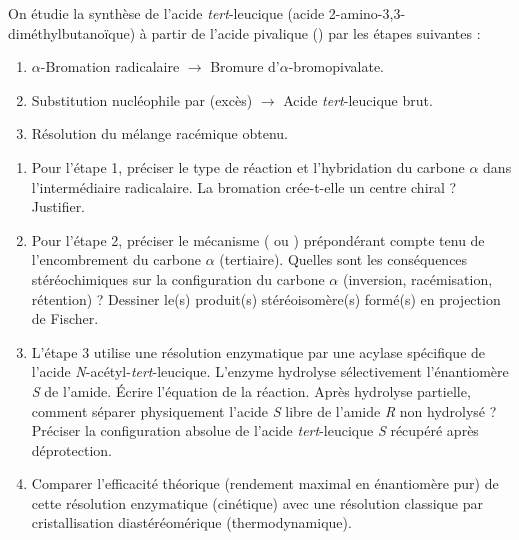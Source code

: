\documentclass[11pt]{article}
\begin{document}
\begin{exercice}
On étudie la synthèse de l'acide \textit{tert}-leucique (acide 2-amino-3,3-diméthylbutanoïque) à partir de l'acide pivalique () par les étapes suivantes :
\begin{enumerate}
    \item $\alpha$-Bromation radicalaire $\to$ Bromure d'$\alpha$-bromopivalate.
    \item Substitution nucléophile par  (excès) $\to$ Acide \textit{tert}-leucique brut.
    \item Résolution du mélange racémique obtenu.
\end{enumerate}
\begin{enumerate}
    \item Pour l'étape 1, préciser le type de réaction et l'hybridation du carbone $\alpha$ dans l'intermédiaire radicalaire. La bromation crée-t-elle un centre chiral ? Justifier.
    \item Pour l'étape 2, préciser le mécanisme ( ou ) prépondérant compte tenu de l'encombrement du carbone $\alpha$ (tertiaire). Quelles sont les conséquences stéréochimiques sur la configuration du carbone $\alpha$ (inversion, racémisation, rétention) ? Dessiner le(s) produit(s) stéréoisomère(s) formé(s) en projection de Fischer.
    \item L'étape 3 utilise une résolution enzymatique par une acylase spécifique de l'acide \textit{N}-acétyl-\textit{tert}-leucique. L'enzyme hydrolyse sélectivement l'énantiomère \textit{S} de l'amide. Écrire l'équation de la réaction. Après hydrolyse partielle, comment séparer physiquement l'acide \textit{S} libre de l'amide \textit{R} non hydrolysé ? Préciser la configuration absolue de l'acide \textit{tert}-leucique \textit{S} récupéré après déprotection.
    \item Comparer l'efficacité théorique (rendement maximal en énantiomère pur) de cette résolution enzymatique (cinétique) avec une résolution classique par cristallisation diastéréomérique (thermodynamique).
\end{enumerate}
\end{exercice}
\end{document}
